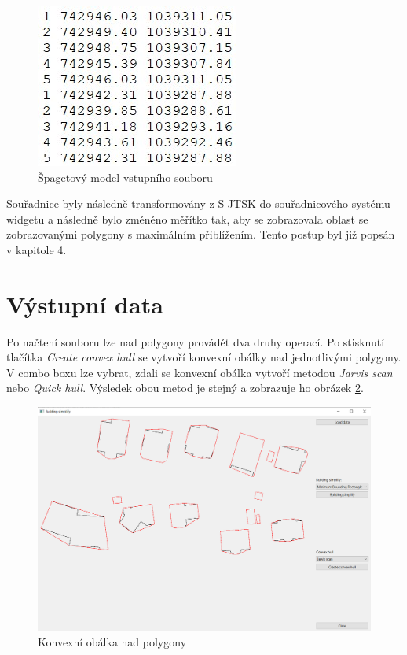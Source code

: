 \documentclass[11pt]{article}
\begin{document}
	\begin{figure}[htbh]
		\centering
		\includegraphics[scale=1]{images/vstup_data_U2.jpg} 
		\caption{Špagetový model vstupního souboru}
		\label{fig:vstup.}
	\end{figure} 
	
	Souřadnice byly následně transformovány z S-JTSK do souřadnicového systému widgetu a následně bylo změněno měřítko tak, aby se zobrazovala oblast se zobrazovanými polygony s maximálním přiblížením. Tento postup byl již popsán v kapitole 4.
	
	\clearpage

	
	
	\section{Výstupní data}
	
	Po načtení souboru lze nad polygony provádět dva druhy operací. Po stisknutí tlačítka \textit{Create convex hull} se vytvoří konvexní obálky nad jednotlivými polygony. V combo boxu lze vybrat, zdali se konvexní obálka vytvoří metodou \textit{Jarvis scan} nebo \textit{Quick hull}. Výsledek obou metod je stejný a zobrazuje ho obrázek \ref{fig:app_convexHull}.
	
	\begin{figure}[htbh]
		\centering
		\includegraphics[scale=0.4]{images/U2_aplikace_ConvexHull.png} 
		\caption{Konvexní obálka nad polygony}
		\label{fig:app_convexHull}
	\end{figure} 
	
\end{document}
